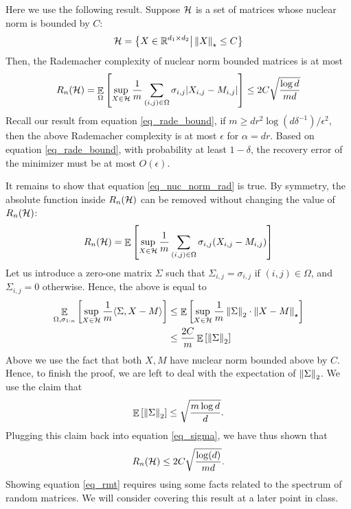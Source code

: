 Here we use the following result.
Suppose $\mathcal{H}$ is a set of matrices whose nuclear norm is bounded by $C$:
\[ \mathcal{H} = \left\{X\in\mathbb{R}^{d_1\times d_2} \big| \left\| X \right\|_{\star} \le C\right\} \]
Then, the Rademacher complexity of nuclear norm bounded matrices is at most
\begin{align}
    R_n(\mathcal{H}) = \mathop{\mathbb{E}}_{\Omega}\left[  \sup_{X\in\mathcal{H}} \frac 1 m \sum_{ (i, j) \in \Omega } \sigma_{i, j} {\left| { X_{i, j} - M_{i, j} } \right|}  \right] \le 2 C \sqrt{\frac {\log d} {m d}} \label{eq_nuc_norm_rad}
\end{align}
Recall our result from equation \eqref{eq_rade_bound}, if $m \ge d  r^2 \log (d\delta^{-1}) / \epsilon^2$, then the above Rademacher complexity is at most $\epsilon$ for $\alpha = d r$.
Based on equation \eqref{eq_rade_bound}, with probability at least $1 - \delta$, the recovery error of the minimizer must be at most $O(\epsilon)$.

It remains to show that equation \eqref{eq_nuc_norm_rad} is true.
By symmetry, the absolute function inside $R_n(\mathcal{H})$ can be removed without changing the value of $R_n(\mathcal{H})$:
\begin{align*}
    R_n(\mathcal{H}) = \mathop{\mathbb{E}}\left[ \sup_{X\in\mathcal{H}} \frac 1 m \sum_{(i, j) \in \Omega} \sigma_{i, j} (X_{i, j} - M_{i, j}) \right]
\end{align*}
Let us introduce a zero-one matrix $\Sigma$ such that $\Sigma_{i, j} = \sigma_{i, j}$ if $(i, j) \in \Omega$, and $\Sigma_{i, j} = 0$ otherwise.
Hence, the above is equal to
\begin{align}
    \mathop{\mathbb{E}}_{\Omega, \sigma_{1:n}}\left[ \sup_{X\in\mathcal{H}} \frac 1 m \langle \Sigma,  X - M  \rangle \right]
    &\le \mathop{\mathbb{E}}\left[ \sup_{X\in\mathcal{H}} \frac 1 m \left\| \Sigma \right\|_{2} \cdot \left\| X - M \right\|_{\star} \right] \nonumber \\
    &\le \frac {2C} {m} \mathop{\mathbb{E}}\left[ \left\| \Sigma \right\|_{2} \right] \label{eq_sigma}
\end{align}
Above we use the fact that both $X, M$ have nuclear norm bounded above by $C$.
Hence, to finish the proof, we are left to deal with the expectation of $\left\| \Sigma \right\|_{2}$.
We use the claim that
\begin{align}
    \mathop{\mathbb{E}}\left[ \left\| \Sigma \right\|_{2} \right] \le \sqrt{ \frac {m \log d} {d}}. \label{eq_rmt}
\end{align}
Plugging this claim back into equation \eqref{eq_sigma}, we have thus shown that
\[ R_n(\mathcal{H}) \le 2C \sqrt{\frac {\log(d)} {m d}}. \]
Showing equation \eqref{eq_rmt} requires using some facts related to the spectrum of random matrices.
We will consider covering this result at a later point in class.
